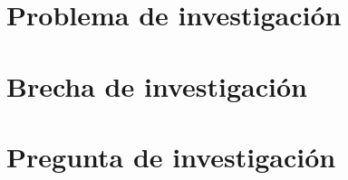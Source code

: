 \documentclass[12pt,a4paper]{report}
\begin{document}
\section{Problema de investigación}

%
%
%
%
%
%


\section{Brecha de investigación}

%
%
%
%
%
%
%
%
%
%
%


\section{Pregunta de investigación}

%
%
%
%
%
\end{document}
